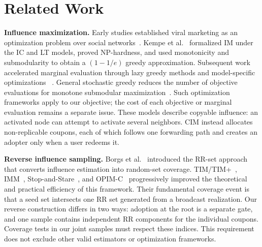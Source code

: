 \documentclass[sigconf,balance=false]{acmart}
\begin{document}
\section{Related Work}
\label{sec:related}

\textbf{Influence maximization.}
Early studies established viral marketing as an optimization problem
over social networks~\cite{domingos2001mining,richardson2002mining}.
Kempe et al.~\cite{kempe2003maximizing} formalized IM under the IC and
LT models, proved NP-hardness, and used monotonicity and submodularity to
obtain a $(1-1/e)$ greedy approximation.
Subsequent work accelerated marginal evaluation through lazy greedy
methods and model-specific optimizations
~\cite{leskovec2007celf,goyal2011celf,chen2009efficient}.
General stochastic greedy reduces the number of objective evaluations for
monotone submodular maximization~\cite{mirzasoleiman2015lazier}.
Such optimization frameworks apply to our objective; the cost of each
objective or marginal evaluation remains a separate issue.
These models describe copyable influence: an activated node can attempt
to activate several neighbors.
CIM instead allocates non-replicable coupons, each of which follows one
forwarding path and creates an adopter only when a user redeems it.

\textbf{Reverse influence sampling.}
Borgs et al.~\cite{borgs2014maximizing} introduced the RR-set approach
that converts influence estimation into random-set coverage.
TIM/TIM+~\cite{tang2014influence}, IMM~\cite{tang2015influence},
Stop-and-Stare~\cite{nguyen2016stop,huang2017revisiting}, and
OPIM-C~\cite{tang2018online} progressively improved the theoretical and
practical efficiency of this framework.
Their fundamental coverage event is that a seed set intersects one RR
set generated from a broadcast realization.
Our reverse construction differs in two ways: adoption at the root is a
separate gate, and one sample contains independent RR components for the
individual coupons.
Coverage tests in our joint samples must respect these indices. This
requirement does not exclude other valid estimators or optimization frameworks.
\end{document}

